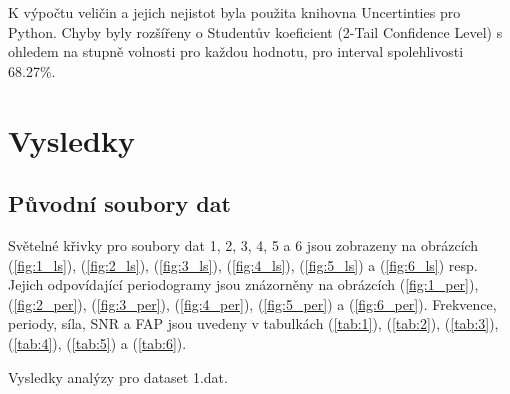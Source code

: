 \documentclass[a4paper,11pt,twocolumn]{article}
\begin{document}
            K výpočtu veličin a jejich nejistot byla použita knihovna Uncertinties pro Python. Chyby byly rozšířeny o Studentův koeficient (2-Tail Confidence Level) s ohledem na stupně volnosti pro každou hodnotu, pro interval spolehlivosti 68.27\%.

    \section{Vysledky}
        \subsection{Původní soubory dat}
            Světelné křivky pro soubory dat 1, 2, 3, 4, 5 a 6 jsou zobrazeny na obrázcích (\ref{fig:1_ls}), (\ref{fig:2_ls}), (\ref{fig:3_ls}), (\ref{fig:4_ls}), (\ref{fig:5_ls}) a (\ref{fig:6_ls}) resp. Jejich odpovídající periodogramy jsou znázorněny na obrázcích (\ref{fig:1_per}), (\ref{fig:2_per}), (\ref{fig:3_per}), (\ref{fig:4_per}), (\ref{fig:5_per}) a (\ref{fig:6_per}). Frekvence, periody, síla, SNR a FAP jsou uvedeny v tabulkách (\ref{tab:1}), (\ref{tab:2}), (\ref{tab:3}), (\ref{tab:4}), (\ref{tab:5}) a (\ref{tab:6}).

            \begin{table}[htbp]
                \centering
                \vspace{-0.5em}
                \caption{Vysledky analýzy pro dataset 1.dat.}
                \label{tab:1}
            \end{table}
            
\end{document}
